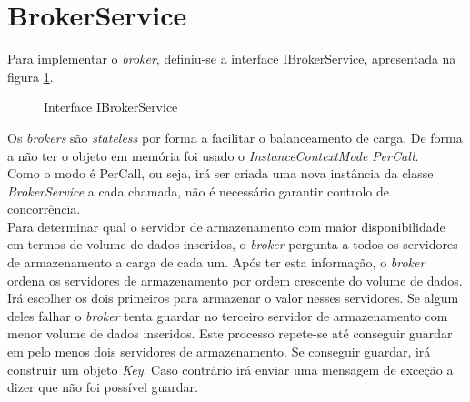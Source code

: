 \section{BrokerService} \label{brokerservice}

Para implementar o \textit{broker}, definiu-se a interface IBrokerService, apresentada na figura \ref{ibrokerservice}.

\begin{figure}[h]
	\caption{Interface IBrokerService}
	\label{ibrokerservice}
\end{figure}

Os \textit{brokers} são \textit{stateless} por forma a facilitar o balanceamento de carga. De forma a não ter o objeto em memória foi usado o \textit{InstanceContextMode} \textit{PerCall}.\\
Como o modo é PerCall, ou seja, irá ser criada uma nova instância da classe \textit{BrokerService} a cada chamada, não é necessário garantir controlo de concorrência.\\
Para determinar qual o servidor de armazenamento com maior disponibilidade em termos de volume de dados inseridos, o \textit{broker} pergunta a todos os servidores de armazenamento a carga de cada um. Após ter esta informação, o \textit{broker} ordena os servidores de armazenamento por ordem crescente do volume de dados. Irá escolher os dois primeiros para armazenar o valor nesses servidores. Se algum deles falhar o \textit{broker} tenta guardar no terceiro servidor de armazenamento com menor volume de dados inseridos. Este processo repete-se até conseguir guardar em pelo menos dois servidores de armazenamento. Se conseguir guardar, irá construir um objeto \textit{Key}. Caso contrário irá enviar uma mensagem de exceção a dizer que não foi possível guardar.\\

